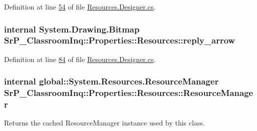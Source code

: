 \-Definition at line \hyperlink{_resources_8_designer_8cs_source_l00054}{54} of file \hyperlink{_resources_8_designer_8cs_source}{\-Resources.\-Designer.\-cs}.

\hypertarget{class_sr_p___classroom_inq_1_1_properties_1_1_resources_ab0a3e726876b922e1691be1f3853b481}{
\subsubsection[{reply\-\_\-arrow}]{\setlength{\rightskip}{0pt plus 5cm}internal \-System.\-Drawing.\-Bitmap \-Sr\-P\-\_\-\-Classroom\-Inq\-::\-Properties\-::\-Resources\-::reply\-\_\-arrow}}
\label{class_sr_p___classroom_inq_1_1_properties_1_1_resources_ab0a3e726876b922e1691be1f3853b481}


\-Definition at line \hyperlink{_resources_8_designer_8cs_source_l00084}{84} of file \hyperlink{_resources_8_designer_8cs_source}{\-Resources.\-Designer.\-cs}.

\hypertarget{class_sr_p___classroom_inq_1_1_properties_1_1_resources_a7809b92866e9561f253e4829dc02560f}{
\subsubsection[{\-Resource\-Manager}]{\setlength{\rightskip}{0pt plus 5cm}internal global\-::\-System.\-Resources.\-Resource\-Manager \-Sr\-P\-\_\-\-Classroom\-Inq\-::\-Properties\-::\-Resources\-::\-Resource\-Manager}}
\label{class_sr_p___classroom_inq_1_1_properties_1_1_resources_a7809b92866e9561f253e4829dc02560f}


\-Returns the cached \-Resource\-Manager instance used by this class. 



